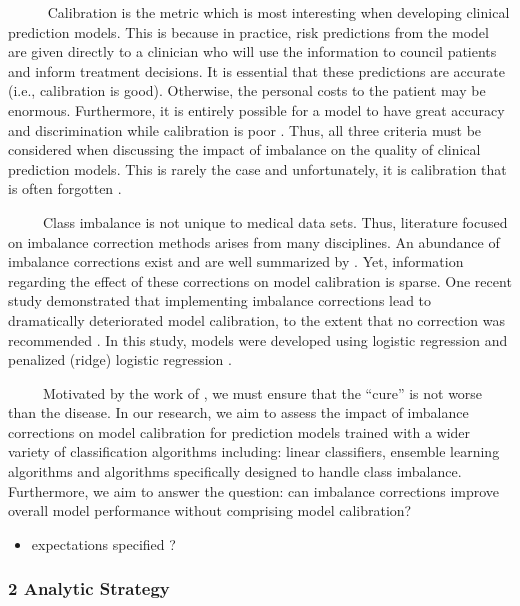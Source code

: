\documentclass[
  11pt,
]{article}
\providecommand{\tightlist}{%
  \setlength{\itemsep}{0pt}\setlength{\parskip}{0pt}}
\begin{document}
~~~~~ Calibration is the metric which is most interesting when
developing clinical prediction models. This is because in practice, risk
predictions from the model are given directly to a clinician who will
use the information to council patients and inform treatment decisions.
It is essential that these predictions are accurate (i.e., calibration
is good). Otherwise, the personal costs to the patient may be enormous.
Furthermore, it is entirely possible for a model to have great accuracy
and discrimination while calibration is poor \autocite{achilles}. Thus,
all three criteria must be considered when discussing the impact of
imbalance on the quality of clinical prediction models. This is rarely
the case and unfortunately, it is calibration that is often forgotten
\autocite{achilles}.

~~~~~Class imbalance is not unique to medical data sets. Thus,
literature focused on imbalance correction methods arises from many
disciplines. An abundance of imbalance corrections exist and are well
summarized by
\autocite{summary_b,summary_lp,summary_m,summary_h,summary_k}. Yet,
information regarding the effect of these corrections on model
calibration is sparse. One recent study demonstrated that implementing
imbalance corrections lead to dramatically deteriorated model
calibration, to the extent that no correction was recommended
\autocite{ruben}. In this study, models were developed using logistic
regression and penalized (ridge) logistic regression \autocite{ruben}.

~~~~~Motivated by the work of \textcite{ruben}, we must ensure that the
``cure'' is not worse than the disease. In our research, we aim to
assess the impact of imbalance corrections on model calibration for
prediction models trained with a wider variety of classification
algorithms including: linear classifiers, ensemble learning algorithms
and algorithms specifically designed to handle class imbalance.
Furthermore, we aim to answer the question: can imbalance corrections
improve overall model performance without comprising model calibration?

\begin{itemize}
\tightlist
\item
  expectations specified ?
\end{itemize}

\newpage

\hypertarget{analytic-strategy}{%
\subsubsection{2\textbar{} Analytic Strategy}\label{analytic-strategy}}
\end{document}
